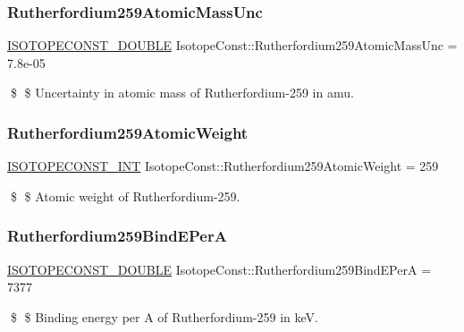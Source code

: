 \subsubsection{\texorpdfstring{Rutherfordium259\+Atomic\+Mass\+Unc}{Rutherfordium259AtomicMassUnc}}
{\footnotesize\ttfamily \mbox{\hyperlink{group___isotope_const-_macros_ga8f45a7272ce02c0b4c65c44636ed719a}{I\+S\+O\+T\+O\+P\+E\+C\+O\+N\+S\+T\+\_\+\+D\+O\+U\+B\+LE}} Isotope\+Const\+::\+Rutherfordium259\+Atomic\+Mass\+Unc = 7.\+8e-\/05}

\$ \$ Uncertainty in atomic mass of Rutherfordium-\/259 in amu. \mbox{\label{group___isotope_const-_rutherfordium-_rf259_ga84e82a66ef4ccf843815c4067e66a2c9}} 
\subsubsection{\texorpdfstring{Rutherfordium259\+Atomic\+Weight}{Rutherfordium259AtomicWeight}}
{\footnotesize\ttfamily \mbox{\hyperlink{group___isotope_const-_macros_ga5f18360b3e99483a35c32d789e62621c}{I\+S\+O\+T\+O\+P\+E\+C\+O\+N\+S\+T\+\_\+\+I\+NT}} Isotope\+Const\+::\+Rutherfordium259\+Atomic\+Weight = 259}

\$ \$ Atomic weight of Rutherfordium-\/259. \mbox{\label{group___isotope_const-_rutherfordium-_rf259_gadc30ce4ff60ce5d79d129de704bad5cf}} 
\subsubsection{\texorpdfstring{Rutherfordium259\+Bind\+E\+PerA}{Rutherfordium259BindEPerA}}
{\footnotesize\ttfamily \mbox{\hyperlink{group___isotope_const-_macros_ga8f45a7272ce02c0b4c65c44636ed719a}{I\+S\+O\+T\+O\+P\+E\+C\+O\+N\+S\+T\+\_\+\+D\+O\+U\+B\+LE}} Isotope\+Const\+::\+Rutherfordium259\+Bind\+E\+PerA = 7377}

\$ \$ Binding energy per A of Rutherfordium-\/259 in keV. \mbox{\label{group___isotope_const-_rutherfordium-_rf259_ga59d4da89038c8a5603b9ce0ad8156966}} 
